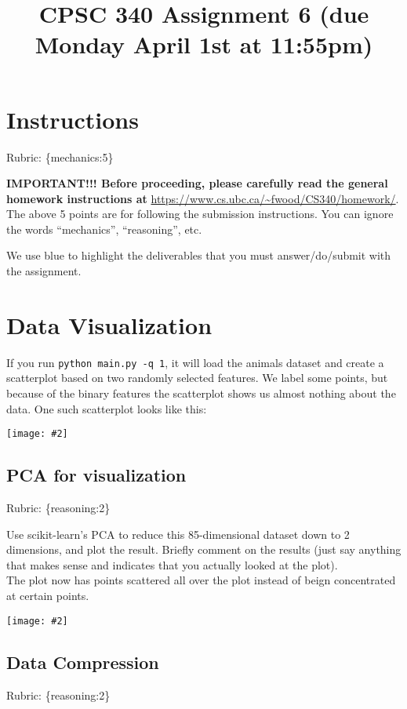 \documentclass{article}
\def\rubric#1{\gre{Rubric: \{#1\}}}{}
\def\blu#1{{\color{blu}#1}}
\def\gre#1{{\color{gre}#1}}
\def\red#1{{\color{red}#1}}
\newcommand{\centerfig}[2]{\begin{center}\texttt{[image: \#2]}\end{center}}
\begin{document}
\title{CPSC 340 Assignment 6 (due Monday April 1st at 11:55pm)}
\date{}
\maketitle

\vspace{-7em}


\section*{Instructions}
\rubric{mechanics:5}

\textbf{IMPORTANT!!! Before proceeding, please carefully read the general homework instructions at} \url{https://www.cs.ubc.ca/~fwood/CS340/homework/}. The above 5 points are for following the submission instructions. You can ignore the words ``mechanics'', ``reasoning'', etc.

\vspace{1em}
We use \blu{blue} to highlight the deliverables that you must answer/do/submit with the assignment.

\section{Data Visualization}

If you run \verb|python main.py -q 1|, it will load the animals dataset and create a scatterplot based on two randomly selected features.
We label some points, but because of the binary features the scatterplot shows us almost nothing about the data. One such scatterplot looks like this:

\centerfig{.5}{./figs/two_random_features.png}

\subsection{PCA for visualization}
\rubric{reasoning:2}

Use scikit-learn's PCA to reduce this 85-dimensional dataset down to 2 dimensions, and plot the result. Briefly comment on the results (just say anything that makes sense and indicates that you actually looked at the plot). \\
\red{The plot now has points scattered all over the plot instead of beign concentrated at certain points.}
\centerfig{.5}{./figs/PCA_animals.png}
\subsection{Data Compression}
\rubric{reasoning:2}
\end{document}

